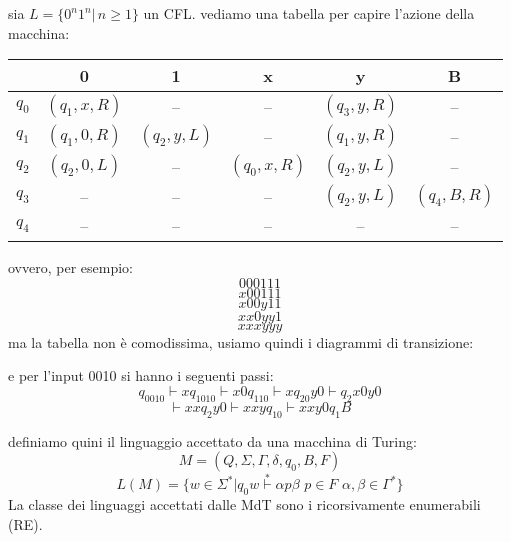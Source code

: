 \documentclass[a4paper,12pt, oneside]{book}
\begin{document}
\begin{esempio}
sia $L=\{0^n1^n|\,n\geq 1\}$ un CFL. vediamo una tabella per capire l'azione della macchina:
\begin{center}
\begin{tabular}{c|c|c|c|c|c|}
 & 0 & 1 & x & y & B\\
\hline
$q_0$ & $(q_1,x,R)$ & -- & --  & $(q_3,y,R)$ & --\\
$q_1$ & $(q_1,0,R)$ & $(q_2,y,L)$ & -- & $(q_1,y,R)$ & --\\
$q_2$ & $(q_2,0,L)$ & -- & $(q_0,x,R)$ & $(q_2,y,L)$ & --\\
$q_3$ & -- & -- & -- & $(q_2,y,L)$ & $(q_4,B,R)$\\
$q_4$ & -- & -- & -- & -- & --
\end{tabular}
\end{center}
ovvero, per esempio:
$$000111$$
$$x00111$$
$$x00y11$$
$$xx0yy1$$
$$xxxyyy$$
\newpage
ma la tabella non è comodissima, usiamo quindi i diagrammi di transizione:
\begin{center}
\end{center}
e per l'input 0010 si hanno i seguenti passi:
$$q_0010\vdash xq_1010\vdash x0q_110\vdash xq_20y0\vdash  q_2x0y0$$
$$\vdash xxq_2y0\vdash xxyq_10\vdash xxy0q_1B$$
\end{esempio}
definiamo quini il linguaggio accettato da una macchina di Turing:
$$M=(Q,\Sigma,\Gamma,\delta,q_0,B,F)$$
$$L(M)=\{w\in\Sigma^*|q_0w\stackrel{*}{\vdash}\alpha p\beta\,\,p\in F\,\,\alpha,\beta\in\Gamma^*\}$$
La classe dei linguaggi accettati dalle MdT sono i ricorsivamente enumerabili (RE).
\end{document}
